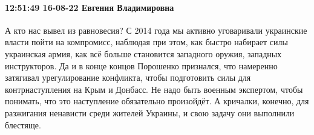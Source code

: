  
 
 
 
 

\paragraph{12:51:49 16-08-22 Евгения Владимировна}

А кто нас вывел из равновесия? С 2014 года мы активно уговаривали украинские
власти пойти на компромисс, наблюдая при этом, как быстро набирает силы
украинская армия, как всё больше становится западного оружия, западных
инструкторов. Да и в конце концов Порошенко признался, что намеренно затягивал
урегулирование конфликта, чтобы подготовить силы для контрнаступления на Крым и
Донбасс. Не надо быть военным экспертом, чтобы понимать, что это наступление
обязательно произойдёт. А кричалки, конечно, для разжигания ненависти среди
жителей Украины, и свою задачу они выполнили блестяще.
